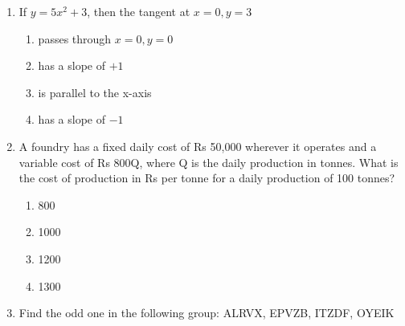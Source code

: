 \documentclass[journal,12pt,onecolumn]{IEEEtran}
\theoremstyle{remark}
\begin{document}
\begin{enumerate}
\begin{multicols}{4}
\begin{enumerate}
\item Rajan has decided to work only in a group.
\item Rajan and Sajan were formed into a group against their wishes.
\item Sajan had decided to give in to Rajan's request to work with him.
\item Rajan had believed that Sajan and he would be working together.
\end{enumerate}
\end{multicols}


\item If \(y = 5x^2 + 3\), then the tangent at \(x = 0, y = 3\) \hfill{}
\begin{multicols}{4}
    

\begin{enumerate}
\item passes through \(x = 0, y = 0\)
\item has a slope of \(+1\)
\item is parallel to the x-axis
\item has a slope of \(-1\)
\end{enumerate}
\end{multicols}


\item A foundry has a fixed daily cost of Rs 50,000 wherever it operates and a variable cost of Rs 800Q, where Q is the daily production in tonnes. What is the cost of production in Rs per tonne for a daily production of 100 tonnes?  \hfill{}

\begin{multicols}{4}

\begin{enumerate}
\item 800
\item 1000
\item 1200
\item 1300
\end{enumerate}
\end{multicols}

\item Find the odd one in the following group: ALRVX, EPVZB, ITZDF, OYEIK   \hfill{}

\begin{multicols}{4}


\end{multicols}
\end{enumerate}
\end{document}
